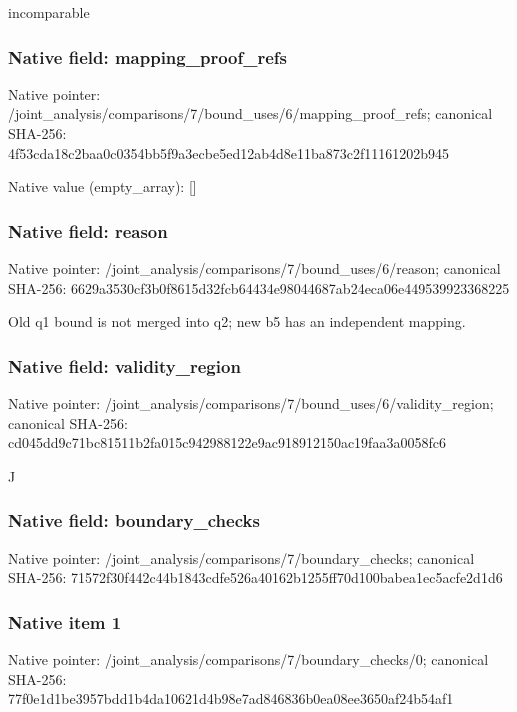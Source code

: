 \documentclass[10pt,a4paper]{article}
\begin{document}
\begingroup\raggedright\sloppy incomparable\par\endgroup

\subsubsection{Native field: mapping\_\allowbreak{}proof\_\allowbreak{}refs}
Native pointer: /joint\_\allowbreak{}analysis/comparisons/7/bound\_\allowbreak{}uses/6/mapping\_\allowbreak{}proof\_\allowbreak{}refs; canonical SHA-256: 4f53cda18c2baa0c0354bb5f9a3ecbe5ed12ab4d8e11ba873c2f11161202b945

Native value (empty\_\allowbreak{}array): []

\subsubsection{Native field: reason}
Native pointer: /joint\_\allowbreak{}analysis/comparisons/7/bound\_\allowbreak{}uses/6/reason; canonical SHA-256: 6629a3530cf3b0f8615d32fcb64434e98044687ab24eca06e449539923368225

\begingroup\raggedright\sloppy Old q1 bound is not merged into q2;\allowbreak{} new b5 has an independent mapping.\par\endgroup

\subsubsection{Native field: validity\_\allowbreak{}region}
Native pointer: /joint\_\allowbreak{}analysis/comparisons/7/bound\_\allowbreak{}uses/6/validity\_\allowbreak{}region; canonical SHA-256: cd045dd9c71bc81511b2fa015c942988122e9ac918912150ac19faa3a0058fc6

\begingroup\raggedright\sloppy J\par\endgroup

\subsubsection{Native field: boundary\_\allowbreak{}checks}
Native pointer: /joint\_\allowbreak{}analysis/comparisons/7/boundary\_\allowbreak{}checks; canonical SHA-256: 71572f30f442c44b1843cdfe526a40162b1255ff70d100babea1ec5acfe2d1d6

\subsubsection{Native item 1}
Native pointer: /joint\_\allowbreak{}analysis/comparisons/7/boundary\_\allowbreak{}checks/0; canonical SHA-256: 77f0e1d1be3957bdd1b4da10621d4b98e7ad846836b0ea08ee3650af24b54af1
\end{document}

